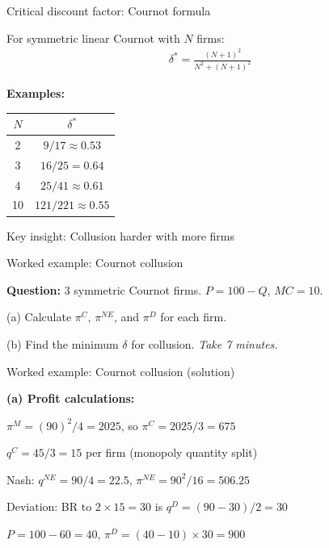 \documentclass[notes,11pt, aspectratio=169]{beamer}
\newenvironment{wideitemize}{\itemize\addtolength{\itemsep}{10pt}}{\enditemize}
\begin{document}
\begin{frame}{Critical discount factor: Cournot formula}
	\begin{wideitemize}
		\item For symmetric linear Cournot with $N$ firms:
		\begin{align*}
			\delta^* = \frac{(N+1)^2}{N^2 + (N+1)^2}
		\end{align*}
		\item \textbf{Examples:}
		\begin{center}
			\begin{tabular}{|c|c|}
				\hline
				$N$ & $\delta^*$ \\
				\hline
				2 & $9/17 \approx 0.53$ \\
				3 & $16/25 = 0.64$ \\
				4 & $25/41 \approx 0.61$ \\
				10 & $121/221 \approx 0.55$ \\
				\hline
			\end{tabular}
		\end{center}
		\item Key insight: Collusion harder with more firms
	\end{wideitemize}
\end{frame}

\begin{frame}{Worked example: Cournot collusion}
	\begin{wideitemize}
		\item \textbf{Question:} 3 symmetric Cournot firms. $P = 100 - Q$, $MC = 10$.
		\item (a) Calculate $\pi^C$, $\pi^{NE}$, and $\pi^D$ for each firm.
		\item (b) Find the minimum $\delta$ for collusion.
	\end{wideitemize}
	\vspace{10pt}
	\centering
	\textit{Take 7 minutes.}
\end{frame}

\begin{frame}{Worked example: Cournot collusion (solution)}
	\begin{wideitemize}
		\item \textbf{(a) Profit calculations:}
		\item $\pi^M = (90)^2/4 = 2025$, so $\pi^C = 2025/3 = 675$
		\item $q^C = 45/3 = 15$ per firm (monopoly quantity split)
		\item Nash: $q^{NE} = 90/4 = 22.5$, $\pi^{NE} = 90^2/16 = 506.25$
		\item Deviation: BR to $2 \times 15 = 30$ is $q^D = (90-30)/2 = 30$
		\item $P = 100 - 60 = 40$, $\pi^D = (40-10) \times 30 = 900$
	\end{wideitemize}
\end{frame}
\end{document}
